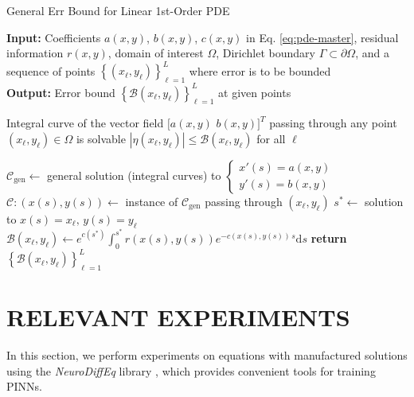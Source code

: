 \documentclass{uai2023}
\newcommand{\Err}{\eta}
\newcommand{\Bound}{\mathcal{B}}
\begin{document}
    \begin{algorithm}
        \small
        \caption{General Err Bound for Linear 1st-Order PDE}\label{alg:linear-first-order-pde-general}
        \textbf{Input:} Coefficients $a(x, y)$, $b(x, y)$, $c(x, y)$ in Eq. \ref{eq:pde-master}, residual information $r(x, y)$, domain of interest $\Omega$, Dirichlet boundary $\Gamma\subset \partial \Omega$, and a sequence of points $\left\{(x_\ell, y_\ell)\right\}_{\ell=1}^{L}$ where error is to be bounded\\
        \textbf{Output:} Error bound $\left\{\Bound(x_\ell, y_\ell)\right\}_{\ell=1}^{L}$ at given points
        \begin{algorithmic}
            \Require Integral curve of the vector field $\big[a(x, y)\,\, b(x, y)\big]^T$ passing through any point $(x_\ell, y_\ell) \in \Omega$ is solvable
            \Ensure $|\Err(x_\ell, y_\ell)| \leq \Bound(x_\ell, y_\ell)$ for all $\ell$

            \State $\mathcal{C}_{\text{gen}} \gets $ general solution (integral curves) to {\smaller $\begin{cases}x'(s) = a(x, y) \\ y'(s) = b(x, y)\end{cases}$}
                \State $\mathcal{C}:(x(s), y(s))\gets$ instance of $\mathcal{C}_{\text{gen}}$ passing through $(x_\ell, y_\ell)$
                \State $s^* \gets$ solution to $x(s) = x_\ell,\, y(s)=y_\ell$
                \State $\displaystyle \Bound(x_\ell, y_\ell) \gets e^{c(s^*)}\int_{0}^{s^*}r(x(s), y(s)) e^{-c(x(s),y(s))\,s}\mathrm{d}s$ 
            \EndFor
            \State \textbf{return} $\left\{\Bound(x_\ell, y_\ell)\right\}_{\ell=1}^{L}$
        \end{algorithmic}
    \end{algorithm}

\section{RELEVANT EXPERIMENTS}\label{section:experiments}
    In this section, we perform experiments on equations with manufactured solutions using the \textit{NeuroDiffEq} library \citep{chen2020neurodiffeq}, which provides convenient tools for training PINNs. 
\end{document}
